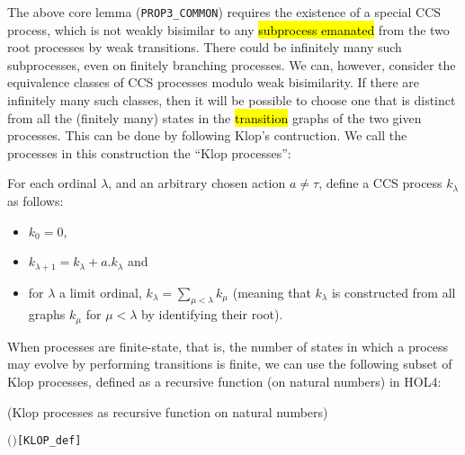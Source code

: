 The above core lemma (\texttt{PROP3_COMMON}) requires the
existence of a special CCS process, which is not weakly bisimilar to
any \hl{subprocess emanated} from the two root processes by weak
transitions.
There could be infinitely many such subprocesses, even on finitely
branching processes.
We can, however, consider the equivalence classes of CCS processes
modulo weak bisimilarity.
If there are infinitely many such classes, 
then it will be 
possible to choose one that is distinct from all the (finitely many) states in the
\hl{transition} graphs of the two given processes.
This can be done by following Klop's contruction.
 We call the processes in this construction the ``Klop processes'':
\begin{definition}
For each ordinal $\lambda$, and an arbitrary chosen action $a \neq \tau$,
define a CCS process $k_\lambda$ as follows:
\begin{itemize}
\item $k_0 = 0$,
\item $k_{\lambda+1} = k_\lambda + a.k_\lambda$ and
\item for $\lambda$ a limit ordinal, $k_\lambda = \sum_{\mu < \lambda}
  k_\mu$ (meaning that $k_\lambda$ is constructed from all graphs
  $k_\mu$ for $\mu < \lambda$ by identifying their root).
\end{itemize}
\end{definition}
When processes are finite-state, that is,
the number of  states in which a process may evolve by performing
transitions is finite, 
we can use  the following subset of Klop processes, 
defined as a recursive function (on natural numbers) in HOL4:
\begin{definition}{(Klop processes as recursive function on natural numbers)}
\begin{alltt}
      \HOLTokenDefEquality{} 
     \ensuremath{(} \ensuremath{)} \HOLTokenDefEquality{}    \HOLSymConst{\ensuremath{+}}  \HOLSymConst{\ensuremath{\ldotp}}  \hfill{[KLOP_def]}
\end{alltt}
\end{definition}

